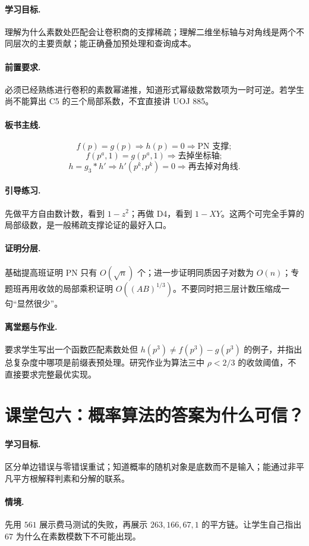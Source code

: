 \paragraph{学习目标.} 理解为什么素数处匹配会让卷积商的支撑稀疏；理解二维坐标轴与对角线是两个不同层次的主要贡献；能正确叠加预处理和查询成本。
\paragraph{前置要求.} 必须已经熟练进行卷积的素数幂递推，知道形式幂级数常数项为一时可逆。若学生尚不能算出 C5 的三个局部系数，不宜直接讲 UOJ 885。
\paragraph{板书主线.}
\[
 f(p)=g(p)\Rightarrow h(p)=0\Rightarrow\text{PN 支撑};
\]
\[
 f(p^a,1)=g(p^a,1)\Rightarrow\text{去掉坐标轴};
\]
\[
 h=g_3*h'\Rightarrow h'(p^k,p^k)=0\Rightarrow\text{再去掉对角线}.
\]
\paragraph{引导练习.} 先做平方自由数计数，看到 $1-z^2$；再做 D4，看到 $1-XY$。这两个可完全手算的局部级数，是一般稀疏支撑论证的最好入口。
\paragraph{证明分层.} 基础提高班证明 PN 只有 $O(\sqrt n)$ 个；进一步证明同质因子对数为 $O(n)$；专题班再用收敛的局部乘积证明 $O((AB)^{1/3})$。不要同时把三层计数压缩成一句“显然很少”。
\paragraph{离堂题与作业.} 要求学生写出一个函数匹配素数处但 $h(p^3)\ne f(p^3)-g(p^3)$ 的例子，并指出总复杂度中哪项是前缀表预处理。研究作业为算法三中 $\rho<2/3$ 的收敛阈值，不直接要求完整最优实现。

\section{课堂包六：概率算法的答案为什么可信？}
\paragraph{学习目标.} 区分单边错误与零错误重试；知道概率的随机对象是底数而不是输入；能通过非平凡平方根解释判素和分解的联系。
\paragraph{情境.} 先用 $561$ 展示费马测试的失败，再展示 $263,166,67,1$ 的平方链。让学生自己指出 $67$ 为什么在素数模数下不可能出现。
